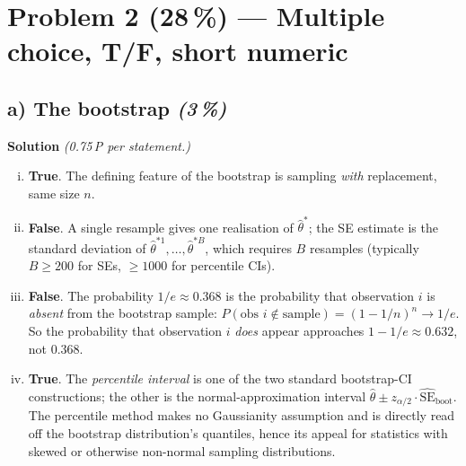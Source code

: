 \documentclass[11pt,a4paper]{article}
\newcommand{\points}[1]{\textbf{(#1\,\%)}}
\newcommand{\subpoints}[1]{\textit{(#1\,\%)}}
\newcommand{\sol}{\noindent\textbf{Solution}}
\begin{document}
\section*{Problem 2 \points{28} --- Multiple choice, T/F, short numeric}

\subsection*{a) The bootstrap \subpoints{3}}
\sol{} \emph{(0.75\,P per statement.)}
\begin{enumerate}[(i)]
  \item \textbf{True}. The defining feature of the bootstrap is sampling \emph{with} replacement, same size $n$.
  \item \textbf{False}. A single resample gives one realisation of $\hat\theta^*$; the SE estimate is the
        standard deviation of $\hat\theta^{*1},\dots,\hat\theta^{*B}$, which requires $B$ resamples (typically
        $B\geq 200$ for SEs, $\geq 1000$ for percentile CIs).
  \item \textbf{False}. The probability $1/e \approx 0.368$ is the probability that observation $i$ is \emph{absent} from the bootstrap sample: $P(\text{obs } i \notin \text{sample}) = (1-1/n)^n \to 1/e$. So the probability that observation $i$ \emph{does} appear approaches $1 - 1/e \approx 0.632$, not $0.368$.
  \item \textbf{True}. The \emph{percentile interval} is one of the two standard bootstrap-CI constructions;
        the other is the normal-approximation interval $\hat\theta \pm z_{\alpha/2}\cdot\widehat{\mathrm{SE}}_{\text{boot}}$.
        The percentile method makes no Gaussianity assumption and is directly read off the bootstrap
        distribution's quantiles, hence its appeal for statistics with skewed or otherwise non-normal
        sampling distributions.
\end{enumerate}
\end{document}
